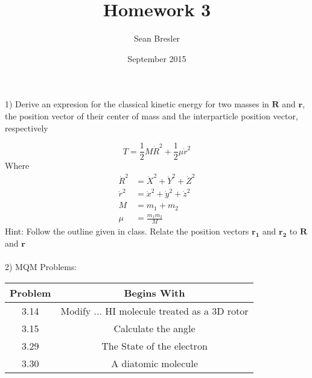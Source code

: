 \documentclass[12pt,twoside,a4paper]{article}
\begin{document}
\title{Homework 3}
\author{Sean Bresler}
\date{September 2015}
\maketitle{}	

1) Derive an expresion for the classical kinetic energy for two masses in $\boldsymbol{R}$ and $\boldsymbol{r}$, the position vector of their center of mass and the interparticle position vector, respectively

	\begin{equation}
		T = \frac{1}{2}M\dot{R}^2
			+\frac{1}{2}\mu\dot{r}^2
	\end{equation}
Where 
	\begin{align*}
		\dot{R}^2 &= \dot{X}^2 + \dot{Y}^2 + \dot{Z}^2 \\
		\dot{r}^2 &= \dot{x}^2 + \dot{y}^2 + \dot{z}^2 \\
		M &= m_1+m_2 \\
		\mu &= \frac{m_1m_2}{M}
	\end{align*}
Hint: Follow the outline given in class. Relate the position vectors $\boldsymbol{r_1}$ and $\boldsymbol{r_2}$ to $\boldsymbol{R}$ and $\boldsymbol{r}$
\\
\\

2) MQM Problems:
\begin{center}
	\begin{tabular}{|c|c|}
		\hline Problem  & Begins With  \\ 
		\hline  3.14 & Modify ... HI molecule treated as a 3D rotor  \\ 
		\hline  3.15 & Calculate the angle  \\ 
		\hline  3.29 & The State of the electron \\ 
		\hline  3.30 & A diatomic molecule \\ 
		\hline 
	\end{tabular} 
\end{center}



	
\end{document}
